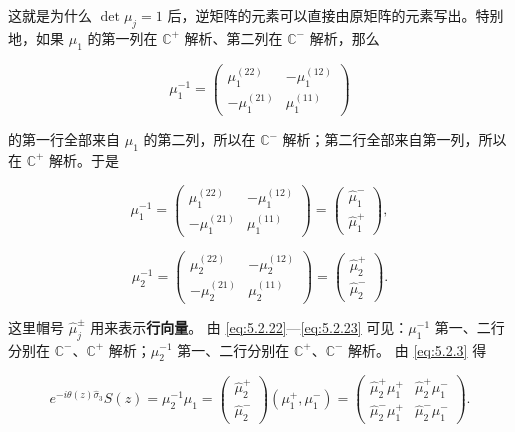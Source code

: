 \documentclass[
    lang=cn,
    scheme=chinese,
    mode=simple,
    device=normal,
    color=blue,
    math=cm,
    thmcnt=section,
    12pt,
    nowatermark
]{elegantbook}
\begin{document}
这就是为什么 $\det\mu_j=1$ 后，逆矩阵的元素可以直接由原矩阵的元素写出。特别地，如果 $\mu_1$ 的第一列在 $\mathbb{C}^+$ 解析、第二列在 $\mathbb{C}^-$ 解析，那么

\[
    \mu_1^{-1}
    =
    \begin{pmatrix}
        \mu_1^{(22)}  & -\mu_1^{(12)} \\
        -\mu_1^{(21)} & \mu_1^{(11)}
    \end{pmatrix}
\]

的第一行全部来自 $\mu_1$ 的第二列，所以在 $\mathbb{C}^-$ 解析；第二行全部来自第一列，所以在 $\mathbb{C}^+$ 解析。于是

\begin{equation}
    \mu_1^{-1}
    =
    \begin{pmatrix}
        \mu_1^{(22)}  & -\mu_1^{(12)} \\
        -\mu_1^{(21)} & \mu_1^{(11)}
    \end{pmatrix}
    =
    \begin{pmatrix}
        \widehat\mu_1^- \\
        \widehat\mu_1^+
    \end{pmatrix},
    \tag{5.2.22}
    \label{eq:5.2.22}
\end{equation}

\begin{equation}
    \mu_2^{-1}
    =
    \begin{pmatrix}
        \mu_2^{(22)}  & -\mu_2^{(12)} \\
        -\mu_2^{(21)} & \mu_2^{(11)}
    \end{pmatrix}
    =
    \begin{pmatrix}
        \widehat\mu_2^+ \\
        \widehat\mu_2^-
    \end{pmatrix}.
    \tag{5.2.23}
    \label{eq:5.2.23}
\end{equation}

这里帽号 $\widehat\mu_j^\pm$ 用来表示\textbf{行向量}。
由 \eqref{eq:5.2.22}---\eqref{eq:5.2.23} 可见：$\mu_1^{-1}$ 第一、二行分别在 $\mathbb{C}^-$、$\mathbb{C}^+$ 解析；$\mu_2^{-1}$ 第一、二行分别在 $\mathbb{C}^+$、$\mathbb{C}^-$ 解析。
由 \eqref{eq:5.2.3} 得

\[
    e^{-i\theta(z)\widehat{\sigma}_3}S(z)
    =
    \mu_2^{-1}\mu_1
    =
    \begin{pmatrix}
        \widehat\mu_2^+ \\
        \widehat\mu_2^-
    \end{pmatrix}
    (\mu_1^+,\mu_1^-)
    =
    \begin{pmatrix}
        \widehat\mu_2^+\mu_1^+ & \widehat\mu_2^+\mu_1^- \\
        \widehat\mu_2^-\mu_1^+ & \widehat\mu_2^-\mu_1^-
    \end{pmatrix}.
\]
\end{document}
